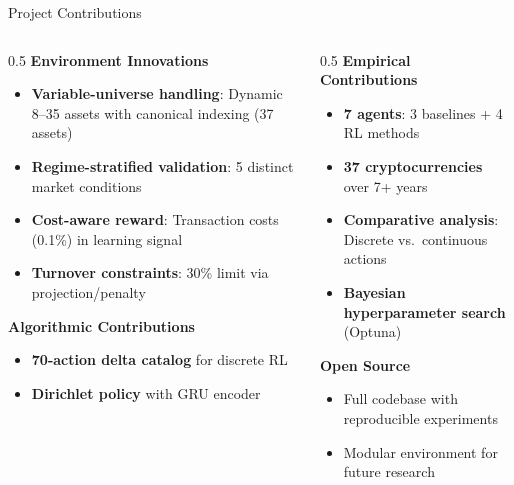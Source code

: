 \documentclass[aspectratio=169]{beamer}
\begin{document}
\begin{frame}{Project Contributions}
\footnotesize

\begin{columns}[T,totalwidth=\textwidth]
\begin{column}{0.5\textwidth}
\textbf{Environment Innovations}
\begin{itemize}\setlength{\itemsep}{2pt}
  \item \textbf{Variable-universe handling}: Dynamic 8--35 assets with canonical indexing (37 assets)
  \item \textbf{Regime-stratified validation}: 5 distinct market conditions
  \item \textbf{Cost-aware reward}: Transaction costs (0.1\%) in learning signal
  \item \textbf{Turnover constraints}: 30\% limit via projection/penalty
\end{itemize}

\vspace{0.2em}
\textbf{Algorithmic Contributions}
\begin{itemize}\setlength{\itemsep}{2pt}
  \item \textbf{70-action delta catalog} for discrete RL
  \item \textbf{Dirichlet policy} with GRU encoder
\end{itemize}
\end{column}

\begin{column}{0.5\textwidth}
\textbf{Empirical Contributions}
\begin{itemize}\setlength{\itemsep}{2pt}
  \item \textbf{7 agents}: 3 baselines + 4 RL methods
  \item \textbf{37 cryptocurrencies} over 7+ years
  \item \textbf{Comparative analysis}: Discrete vs.\ continuous actions
  \item \textbf{Bayesian hyperparameter search} (Optuna)
\end{itemize}

\vspace{0.2em}
\textbf{Open Source}
\begin{itemize}\setlength{\itemsep}{2pt}
  \item Full codebase with reproducible experiments
  \item Modular environment for future research
\end{itemize}
\end{column}
\end{columns}

\end{frame}
\end{document}

